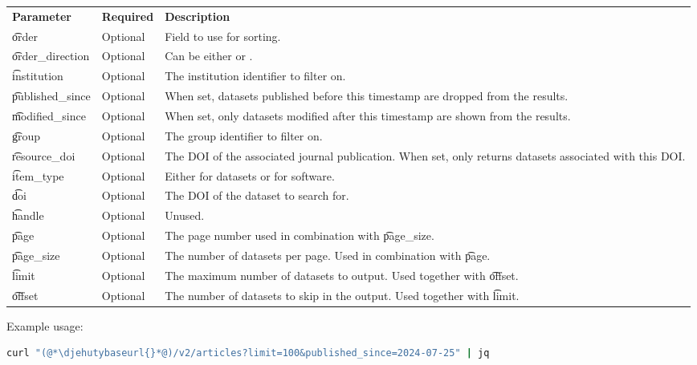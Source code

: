 \begin{tabularx}{\textwidth}{*{2}{!{\VRule[-1pt]}l}!{\VRule[-1pt]}X}
  \headrow
  \textbf{Parameter}   & \textbf{Required} & \textbf{Description}\\
  \t{order}            & Optional & Field to use for sorting.\\
  \t{order\_direction} & Optional & Can be either  or .\\
  \t{institution}      & Optional & The institution identifier to filter on.\\
  \t{published\_since} & Optional & When set, datasets published before this
                                    timestamp are dropped from the results.\\
  \t{modified\_since}  & Optional & When set, only datasets modified after
                                    this timestamp are shown from the results.\\
  \t{group}            & Optional & The group identifier to filter on.\\
  \t{resource\_doi}    & Optional & The DOI of the associated journal publication.
                                    When set, only returns datasets associated
                                    with this DOI.\\
  \t{item\_type}       & Optional & Either  for datasets or 
                                    for software.\\
  \t{doi}              & Optional & The DOI of the dataset to search for.\\
  \t{handle}           & Optional & Unused.\\
  \t{page}             & Optional & The page number used in combination with
                                    \t{page\_size}.\\
  \t{page\_size}       & Optional & The number of datasets per page.  Used
                                    in combination with \t{page}.\\
  \t{limit}            & Optional & The maximum number of datasets to output.
                                    Used together with \t{offset}.\\
  \t{offset}           & Optional & The number of datasets to skip in the
                                    output.  Used together with \t{limit}.
\end{tabularx}

  Example usage:
\begin{lstlisting}[language=bash]
curl "(@*\djehutybaseurl{}*@)/v2/articles?limit=100&published_since=2024-07-25" | jq
\end{lstlisting}

